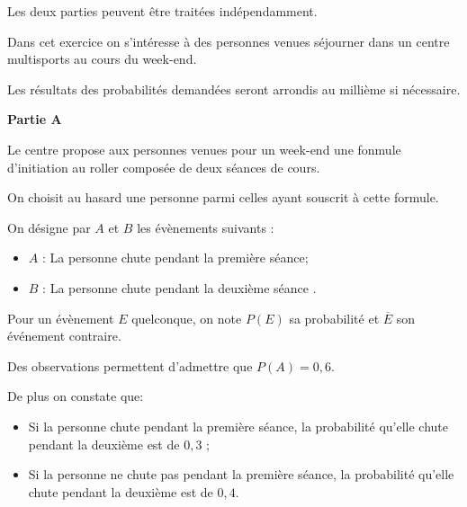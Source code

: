 \medskip

Les deux parties peuvent être traitées indépendamment.

Dans cet exercice on s'intéresse à des personnes venues séjourner dans un centre multisports au cours du week-end.

Les résultats des probabilités demandées seront arrondis au millième si nécessaire.

\bigskip

\begin{center}\textbf{Partie A} \end{center}

 Le centre propose aux personnes venues pour un week-end une fonmule d'initiation
au roller composée de deux séances de cours.

On choisit au hasard une personne parmi celles ayant souscrit à cette formule.

\medskip

On désigne par $A$ et $B$ les évènements suivants :

\begin{itemize}[label=$\bullet~$]
\item $A$ : \og La personne chute pendant la première séance\fg ;
\item $B$ : \og La personne chute pendant la deuxième séance \fg.
\end{itemize}

Pour un évènement $E$ quelconque, on note $P(E)$ sa probabilité et $\overline{E}$ son événement contraire.

Des observations permettent d'admettre que $P(A) = 0,6$.

De plus on constate que:

\begin{itemize}[label=$\bullet~$]
\item Si la personne chute pendant la première séance, la probabilité qu'elle chute pendant la deuxième est de $0,3$ ;
\item Si la personne ne chute pas pendant la première séance, la probabilité qu'elle chute pendant la deuxième est de $0,4$.
\end{itemize}

\medskip


